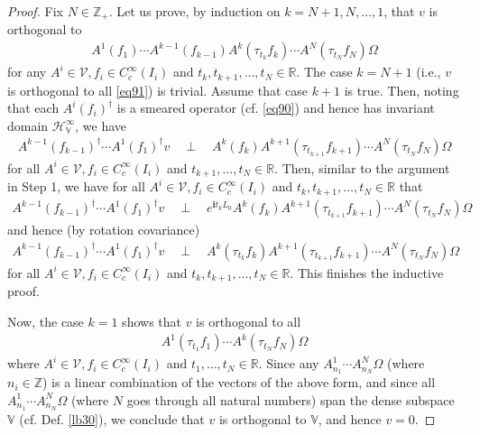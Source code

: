 \documentclass[12pt,b5paper,notitlepage]{article}
\theoremstyle{definition}
\theoremstyle{plain}
\newcommand{\mc}{\mathcal}
\newcommand{\ovl}{\overline}
\newcommand{\im}{\mathbf{i}}
\newcommand{\Vbb}{\mathbb V}
\newcommand{\Zbb}{\mathbb Z}
\newcommand{\Rbb}{\mathbb R}
\newcommand{\HV}{\mathcal H_{\mathbb V}}
\numberwithin{equation}{section}
\begin{document}
\begin{proof}
Fix $N\in\Zbb_+$. Let us prove, by induction on $k=N+1,N,\dots,1$, that $v$ is orthogonal to 
\begin{align*}
A^1(f_1)\cdots A^{k-1}(f_{k-1})A^k(\tau_{t_k}f_k)\cdots A^N(\tau_{t_N}f_N)\Omega
\end{align*}
for any $A^i\in\mc V,f_i\in C_c^\infty(I_i)$ and $t_k,t_{k+1},\dots,t_N\in\Rbb$. The case $k=N+1$ (i.e., $v$ is orthogonal to all \eqref{eq91}) is trivial. Assume that case $k+1$ is true. Then, noting that each $A^i(f_i)^\dagger$ is a smeared operator (cf. \eqref{eq90}) and hence has invariant domain $\HV^\infty$, we have
\begin{align*}
A^{k-1}(f_{k-1})^\dagger\cdots A^1(f_1)^\dagger v\quad\perp\quad A^k(f_k) A^{k+1}(\tau_{t_{k+1}}f_{k+1})\cdots A^N(\tau_{t_N}f_N)\Omega
\end{align*}
for all $A^i\in\mc V,f_i\in C_c^\infty(I_i)$ and $t_{k+1},\dots,t_N\in\Rbb$. Then, similar to the argument in Step 1, we have for all $A^i\in\mc V,f_i\in C_c^\infty(I_i)$ and $t_k,t_{k+1},\dots,t_N\in\Rbb$ that
\begin{align*}
A^{k-1}(f_{k-1})^\dagger\cdots A^1(f_1)^\dagger v\quad\perp\quad e^{\im t_k\ovl{L_0}}A^k(f_k) A^{k+1}(\tau_{t_{k+1}}f_{k+1})\cdots A^N(\tau_{t_N}f_N)\Omega
\end{align*}
and hence (by rotation covariance)
\begin{align*}
A^{k-1}(f_{k-1})^\dagger\cdots A^1(f_1)^\dagger v\quad\perp\quad A^k(\tau_{t_k}f_k) A^{k+1}(\tau_{t_{k+1}}f_{k+1})\cdots A^N(\tau_{t_N}f_N)\Omega
\end{align*}
for all $A^i\in\mc V,f_i\in C_c^\infty(I_i)$ and $t_k,t_{k+1},\dots,t_N\in\Rbb$. This finishes the inductive proof.

Now, the case $k=1$ shows that $v$ is orthogonal to all
\begin{align*}
A^1(\tau_{t_1}f_1)\cdots A^k(\tau_{t_N}f_N)\Omega
\end{align*}
where $A^i\in\mc V,f_i\in C_c^\infty(I_i)$ and $t_1,\dots,t_N\in\Rbb$. Since any $A^1_{n_1}\cdots A^N_{n_N}\Omega$ (where $n_i\in\Zbb$) is a linear combination of the vectors of the above form, and since all $A^1_{n_1}\cdots A^N_{n_N}\Omega$ (where $N$ goes through all natural numbers) span the dense subspace $\Vbb$ (cf. Def. \ref{lb30}), we conclude that $v$ is orthogonal to $\Vbb$, and hence $v=0$.
\end{proof}


\subsection{}
\end{document}
